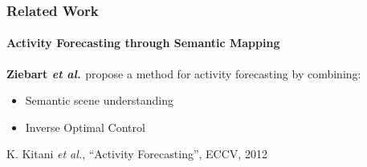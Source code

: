 \begin{frame}
	\frametitle{Related Work}
	\framesubtitle{Activity Forecasting through Semantic Mapping}
	
	\vspace{0.33cm}
	
	\large
	
	\textbf{Ziebart \emph{et al.} \cite{Kitani12}} propose a method for activity forecasting by
	combining:
	
	\begin{itemize}
		\item Semantic scene understanding
		\vspace{0.05cm}
		\item Inverse Optimal Control
	\end{itemize}
	
	\vspace{-0.2cm}
	
	\begin{center}
	\end{center}
	
	\vspace{-0.3cm}
	
	\tiny
	
	\cite{Kitani12} K. Kitani \emph{et al.}, ``Activity Forecasting'', ECCV, 2012
\end{frame}

